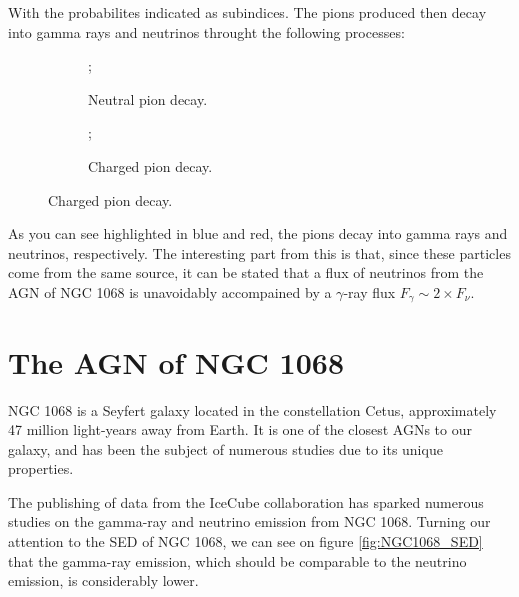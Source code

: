 With the probabilites indicated as subindices. The pions produced then decay into gamma rays and neutrinos throught the following processes:
\vspace{-0.275cm}
\begin{figure}[H]
    \centering
    \begin{subfigure}{0.45\textwidth}
        \centering
        ;
        \caption{Neutral pion decay.}
    \end{subfigure}
    \begin{subfigure}{0.45\textwidth}
        \centering
        ;
        \caption{Charged pion decay.}
    \end{subfigure}
  \end{figure}

As you can see highlighted in blue and red, the pions decay into gamma rays and neutrinos, respectively.
The interesting part from this is that, since these particles come from the same source, it can be stated that a flux of neutrinos from the AGN of NGC 1068 is unavoidably accompained by a $\gamma$-ray flux $F_\gamma \sim 2 \times F_\nu$.

\section{The AGN of NGC 1068}

NGC 1068 is a Seyfert galaxy located in the constellation Cetus, approximately 47 million light-years away from Earth. It is one of the closest AGNs to our galaxy, and has been the subject of numerous studies due to its unique properties.

The publishing of data from the IceCube collaboration \citep{IceCube2022} has sparked numerous studies on the gamma-ray and neutrino emission from NGC 1068. Turning our attention to the SED of NGC 1068, we can see on figure \ref{fig:NGC1068_SED} that the gamma-ray emission, which should be comparable to the neutrino emission, is considerably lower.



